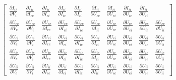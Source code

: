 \documentclass[12pt,twoside]{article}
\begin{document}
\[\begin{bmatrix}
    \frac{\partial I_{ii}}{\partial V_i} & 
    \frac{\partial I_{ii}}{\partial I_{ee}} &
    \frac{\partial I_{ii}}{\partial I_{ei}} &
    \frac{\partial I_{ii}}{\partial I_{ie}} &
    \frac{\partial I_{ii}}{\partial I_{ii}} &
    \frac{\partial I_{ii}}{\partial U_{ee}} &
    \frac{\partial I_{ii}}{\partial U_{ei}} &
    \frac{\partial I_{ii}}{\partial U_{ie}} &
    \frac{\partial I_{ii}}{\partial U_{ii}} \\[1ex]
  \frac{\partial U_{ee}}{\partial V_e} & 
    \frac{\partial U_{ee}}{\partial V_i} & 
    \frac{\partial U_{ee}}{\partial I_{ee}} &
    \frac{\partial U_{ee}}{\partial I_{ei}} &
    \frac{\partial U_{ee}}{\partial I_{ie}} &
    \frac{\partial U_{ee}}{\partial I_{ii}} &
    \frac{\partial U_{ee}}{\partial U_{ee}} &
    \frac{\partial U_{ee}}{\partial U_{ei}} &
    \frac{\partial U_{ee}}{\partial U_{ie}} &
    \frac{\partial U_{ee}}{\partial U_{ii}} \\[1ex]
  \frac{\partial U_{ei}}{\partial V_e} & 
    \frac{\partial U_{ei}}{\partial V_i} & 
    \frac{\partial U_{ei}}{\partial I_{ee}} &
    \frac{\partial U_{ei}}{\partial I_{ei}} &
    \frac{\partial U_{ei}}{\partial I_{ie}} &
    \frac{\partial U_{ei}}{\partial I_{ii}} &
    \frac{\partial U_{ei}}{\partial U_{ee}} &
    \frac{\partial U_{ei}}{\partial U_{ei}} &
    \frac{\partial U_{ei}}{\partial U_{ie}} &
    \frac{\partial U_{ei}}{\partial U_{ii}} \\[1ex]
  \frac{\partial U_{ie}}{\partial V_e} & 
    \frac{\partial U_{ie}}{\partial V_i} & 
    \frac{\partial U_{ie}}{\partial I_{ee}} &
    \frac{\partial U_{ie}}{\partial I_{ei}} &
    \frac{\partial U_{ie}}{\partial I_{ie}} &
    \frac{\partial U_{ie}}{\partial I_{ii}} &
    \frac{\partial U_{ie}}{\partial U_{ee}} &
    \frac{\partial U_{ie}}{\partial U_{ei}} &
    \frac{\partial U_{ie}}{\partial U_{ie}} &
    \frac{\partial U_{ie}}{\partial U_{ii}} \\[1ex]
  \frac{\partial U_{ii}}{\partial V_e} & 
    \frac{\partial U_{ii}}{\partial V_i} & 
    \frac{\partial U_{ii}}{\partial I_{ee}} &
    \frac{\partial U_{ii}}{\partial I_{ei}} &
    \frac{\partial U_{ii}}{\partial I_{ie}} &
    \frac{\partial U_{ii}}{\partial I_{ii}} &
    \frac{\partial U_{ii}}{\partial U_{ee}} &
    \frac{\partial U_{ii}}{\partial U_{ei}} &
    \frac{\partial U_{ii}}{\partial U_{ie}} &
    \frac{\partial U_{ii}}{\partial U_{ii}}
\end{bmatrix}
\]
\end{document}
